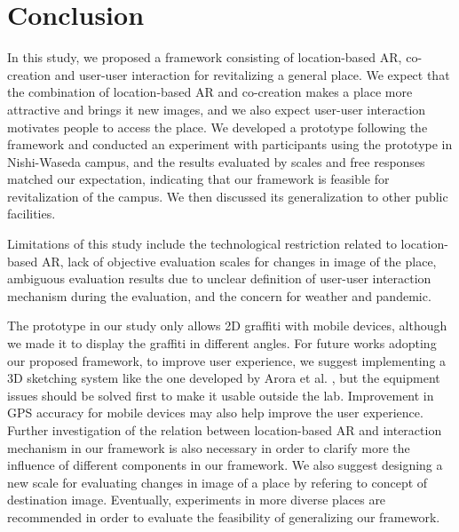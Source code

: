 \chapter{Conclusion}\label{ch:7}

In this study, we proposed a framework consisting of location-based AR, co-creation and user-user interaction for revitalizing a general place.
We expect that the combination of location-based AR and co-creation makes a place more attractive and brings it new images, and we also expect user-user interaction motivates people to access the place.
We developed a prototype following the framework and conducted an experiment with participants using the prototype in Nishi-Waseda campus, and the results evaluated by scales and free responses matched our expectation,
indicating that our framework is feasible for revitalization of the campus.
We then discussed its generalization to other public facilities.

Limitations of this study include the technological restriction related to location-based AR, lack of objective evaluation scales for changes in image of the place,
ambiguous evaluation results due to unclear definition of user-user interaction mechanism during the evaluation, and the concern for weather and pandemic.

The prototype in our study only allows 2D graffiti with mobile devices, although we made it to display the graffiti in different angles.
For future works adopting our proposed framework, to improve user experience, we suggest implementing a 3D sketching system like the one developed by Arora et al. \cite{arora_habib_kazi_grossman_fitzmaurice_singh_2018}, but the equipment issues should be solved first to make it usable outside the lab.
Improvement in GPS accuracy for mobile devices may also help improve the user experience.
Further investigation of the relation between location-based AR and interaction mechanism in our framework is also necessary in order to clarify more the influence of different components in our framework.
We also suggest designing a new scale for evaluating changes in image of a place by refering to concept of destination image.
Eventually, experiments in more diverse places are recommended in order to evaluate the feasibility of generalizing our framework.